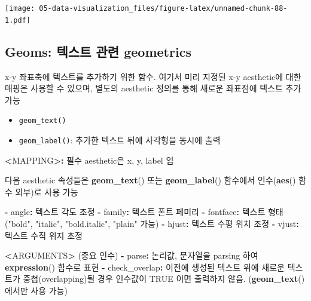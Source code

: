 \documentclass[
  11pt,
]{krantz}
\newenvironment{Shaded}{\begin{snugshade}}{\end{snugshade}}
\newcommand{\ErrorTok}[1]{\textcolor[rgb]{0.14,0.14,0.14}{\textbf{#1}}}
\newcommand{\KeywordTok}[1]{\textcolor[rgb]{0.27,0.27,0.27}{\textbf{#1}}}
\newcommand{\NormalTok}[1]{#1}
\newcommand{\OperatorTok}[1]{\textcolor[rgb]{0.43,0.43,0.43}{\textbf{#1}}}
\newcommand{\OtherTok}[1]{\textcolor[rgb]{0.37,0.37,0.37}{#1}}
\newcommand{\StringTok}[1]{\textcolor[rgb]{0.5,0.5,0.5}{#1}}
\providecommand{\tightlist}{%
  \setlength{\itemsep}{0pt}\setlength{\parskip}{0pt}}
\begin{document}
\texttt{[image: 05-data-visualization\_files/figure-latex/unnamed-chunk-88-1.pdf]}

\normalsize

\hypertarget{geom-texts}{%
\subsection{Geoms: 텍스트 관련 geometrics}\label{geom-texts}}

x-y 좌표축에 텍스트를 추가하기 위한 함수. 여기서 미리 지정된 x-y aesthetic에 대한 매핑은 사용할 수 있으며, 별도의 aesthetic 정의를 통해 새로운 좌표점에 텍스트 추가 가능

\begin{itemize}
\tightlist
\item
  \texttt{geom\_text()}
\item
  \texttt{geom\_label()}: 추가한 텍스트 뒤에 사각형을 동시에 출력
\end{itemize}

\footnotesize

\begin{Shaded}
\begin{Highlighting}[]
\OperatorTok{<}\NormalTok{MAPPING}\OperatorTok{>}\ErrorTok{:}\StringTok{ }\NormalTok{필수 aesthetic은 x, y, label 임}

\NormalTok{다음 aesthetic 속성들은 }\KeywordTok{geom_text}\NormalTok{() 또는 }\KeywordTok{geom_label}\NormalTok{() }
\NormalTok{함수에서 인수(}\KeywordTok{aes}\NormalTok{() 함수 외부)로 사용 가능}

\OperatorTok{-}\StringTok{ }\NormalTok{angle}\OperatorTok{:}\StringTok{ }\NormalTok{텍스트 각도 조정}
\OperatorTok{-}\StringTok{ }\NormalTok{family}\OperatorTok{:}\StringTok{ }\NormalTok{텍스트 폰트 페미리}
\OperatorTok{-}\StringTok{ }\NormalTok{fontface}\OperatorTok{:}\StringTok{ }\NormalTok{텍스트 형태(}\StringTok{"bold"}\NormalTok{, }\StringTok{"italic"}\NormalTok{, }\StringTok{"bold.italic"}\NormalTok{, }\StringTok{"plain"}\NormalTok{ 가능)}
\OperatorTok{-}\StringTok{ }\NormalTok{hjust}\OperatorTok{:}\StringTok{ }\NormalTok{텍스트 수평 위치 조정}
\OperatorTok{-}\StringTok{ }\NormalTok{vjust}\OperatorTok{:}\StringTok{ }\NormalTok{텍스트 수직 위지 초정}

\OperatorTok{<}\NormalTok{ARGUMENTS}\OperatorTok{>}\StringTok{ }\NormalTok{(중요 인수)}
  \OperatorTok{-}\StringTok{ }\NormalTok{parse}\OperatorTok{:}\StringTok{ }\NormalTok{논리값, 문자열을 parsing 하여 }\KeywordTok{expression}\NormalTok{() 함수로 표현}
  \OperatorTok{-}\StringTok{ }\NormalTok{check_overlap}\OperatorTok{:}\StringTok{ }\NormalTok{이전에 생성된 텍스트 위에 새로운 텍스트가 중첩(overlapping)될 경우}
\NormalTok{                   인수값이 }\OtherTok{TRUE}\NormalTok{ 이면 출력하지 않음. (}\KeywordTok{geom_text}\NormalTok{()에서만 사용 가능)}
\end{Highlighting}
\end{Shaded}
\end{document}
